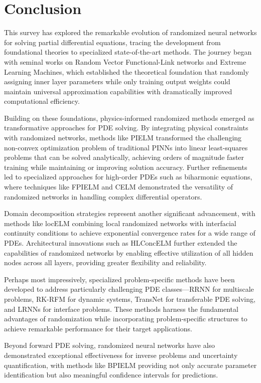 \documentclass[11pt]{article}
\begin{document}
\section{Conclusion}

This survey has explored the remarkable evolution of randomized neural networks for solving partial differential equations, tracing the development from foundational theories to specialized state-of-the-art methods. The journey began with seminal works on Random Vector Functional-Link networks and Extreme Learning Machines, which established the theoretical foundation that randomly assigning inner layer parameters while only training output weights could maintain universal approximation capabilities with dramatically improved computational efficiency.

Building on these foundations, physics-informed randomized methods emerged as transformative approaches for PDE solving. By integrating physical constraints with randomized networks, methods like PIELM transformed the challenging non-convex optimization problem of traditional PINNs into linear least-squares problems that can be solved analytically, achieving orders of magnitude faster training while maintaining or improving solution accuracy. Further refinements led to specialized approaches for high-order PDEs such as biharmonic equations, where techniques like FPIELM and CELM demonstrated the versatility of randomized networks in handling complex differential operators.

Domain decomposition strategies represent another significant advancement, with methods like locELM combining local randomized networks with interfacial continuity conditions to achieve exponential convergence rates for a wide range of PDEs. Architectural innovations such as HLConcELM further extended the capabilities of randomized networks by enabling effective utilization of all hidden nodes across all layers, providing greater flexibility and reliability.

Perhaps most impressively, specialized problem-specific methods have been developed to address particularly challenging PDE classes—RRNN for multiscale problems, RK-RFM for dynamic systems, TransNet for transferable PDE solving, and LRNNs for interface problems. These methods harness the fundamental advantages of randomization while incorporating problem-specific structures to achieve remarkable performance for their target applications.

Beyond forward PDE solving, randomized neural networks have also demonstrated exceptional effectiveness for inverse problems and uncertainty quantification, with methods like BPIELM providing not only accurate parameter identification but also meaningful confidence intervals for predictions.
\end{document}
